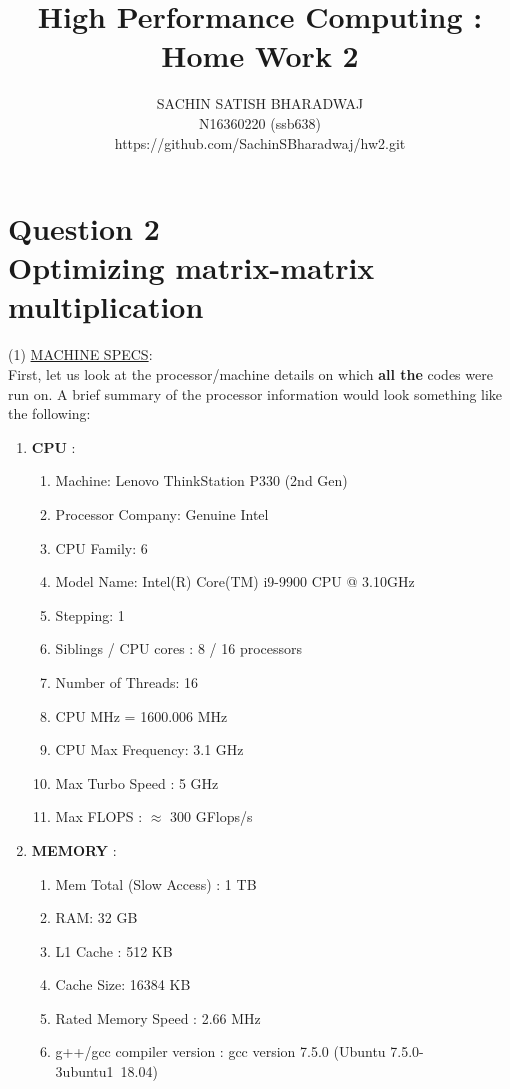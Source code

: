 \documentclass{article}
\title{High Performance Computing : Home Work 2}
\author{SACHIN SATISH BHARADWAJ\\ N16360220 (ssb638)\\ https://github.com/SachinSBharadwaj/hw2.git}
\date{}
\begin{document}
\maketitle
\section*{Question 2\\ Optimizing matrix-matrix multiplication}
(1) \underline{MACHINE SPECS}: \\

\noindent First, let us look at the processor/machine details on which \textbf{all the} codes were run on. A brief summary of the processor information would look something like the following:
\begin{enumerate}
    \item \textbf{CPU} :
    \begin{enumerate}
        \item Machine: Lenovo ThinkStation P330 (2nd Gen)
        \item Processor Company: Genuine Intel
        \item CPU Family: 6
        \item Model Name: Intel(R) Core(TM) i9-9900 CPU @ 3.10GHz
        \item Stepping: 1
        \item Siblings / CPU cores : 8 / 16 processors
        \item Number of Threads: 16
        \item CPU MHz = 1600.006 MHz
        \item CPU Max Frequency: 3.1 GHz
        \item Max Turbo Speed : 5 GHz
        \item Max FLOPS : $\approx$ 300 GFlops/s
    \end{enumerate}
    \item \textbf{MEMORY} :
    \begin{enumerate}
         \item Mem Total (Slow Access) : 1 TB
        \item RAM: 32 GB
        \item L1 Cache : 512 KB
        \item Cache Size: 16384 KB
        \item Rated Memory Speed : 2.66 MHz
        \item g++/gcc compiler version : gcc version 7.5.0 (Ubuntu 7.5.0-3ubuntu1~18.04)
 
    \end{enumerate}
\end{enumerate}
\end{document}
